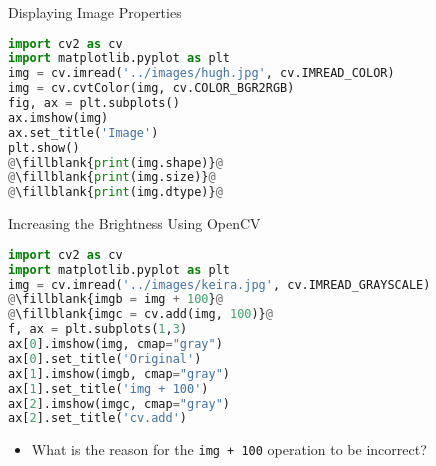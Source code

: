 \begin{frame}[t, fragile]{Displaying  Image Properties}
    \begin{lstlisting}[caption=Displaying  Image Properties, language=Python, escapechar=\@]
%matplotlib inline
import cv2 as cv
import matplotlib.pyplot as plt
img = cv.imread('../images/hugh.jpg', cv.IMREAD_COLOR)
img = cv.cvtColor(img, cv.COLOR_BGR2RGB)
fig, ax = plt.subplots()
ax.imshow(img)
ax.set_title('Image')
plt.show()
@\fillblank{print(img.shape)}@
@\fillblank{print(img.size)}@
@\fillblank{print(img.dtype)}@
    \end{lstlisting}
\end{frame}



\begin{frame}[t, fragile]{Increasing the Brightness Using OpenCV}
    \begin{lstlisting}[caption=Increasing the Brightness Using OpenCV, language=Python, escapechar=\@]
import cv2 as cv
import matplotlib.pyplot as plt
img = cv.imread('../images/keira.jpg', cv.IMREAD_GRAYSCALE)
@\fillblank{imgb = img + 100}@
@\fillblank{imgc = cv.add(img, 100)}@
f, ax = plt.subplots(1,3)
ax[0].imshow(img, cmap="gray")
ax[0].set_title('Original')
ax[1].imshow(imgb, cmap="gray")
ax[1].set_title('img + 100')
ax[2].imshow(imgc, cmap="gray")
ax[2].set_title('cv.add')
    \end{lstlisting}
\begin{itemize}
    \item What is the reason for the \lstinline!img + 100! operation to be incorrect?
\end{itemize}
\end{frame}

